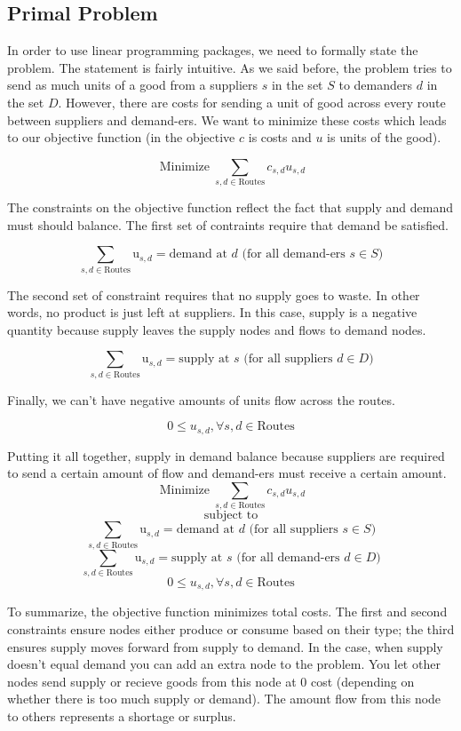 \documentclass{report}
\begin{document}
\subsection{Primal Problem}

In order to use linear programming packages, we need to formally state the problem. The statement is fairly intuitive. As we said before, the problem tries to send as much units of a good from a suppliers $s$ in the set $S$ to demanders $d$ in the set $D$. However, there are costs for sending a unit of good across every route between suppliers and demand-ers. We want to minimize these costs which leads to our objective function (in the objective $c$ is costs and $u$ is units of the good).

$$\operatorname{Minimize} \sum_{s,d \in \text{Routes}} c_{s,d} u_{s,d}$$

The constraints on the objective function reflect the fact that supply and demand must should balance. The first set of contraints require that demand be satisfied.

$$\sum_{s,d \in \text{Routes}} \text{u}_{s,d}= \text{demand at } d \text{ (for all demand-ers } s \in S)$$

The second set of constraint requires that no supply goes to waste. In other words, no product is just left at suppliers. In this case, supply is a negative quantity because supply leaves the supply nodes and flows to demand nodes.

$$\sum_{s,d \in \text{Routes}} \text{u}_{s,d}= \text{supply at } s \text{ (for all suppliers } d \in D)$$

Finally, we can't have negative amounts of units flow across the routes.

$$0 \leq u_{s,d}, \forall s,d \in \text{Routes}$$

Putting it all together, supply in demand balance because suppliers are required to send a certain amount of flow and demand-ers must receive a certain amount.
$$\operatorname{Minimize} \sum_{s,d \in \text{Routes}} c_{s,d} u_{s,d}$$
$$\text{subject to}$$
$$\sum_{s,d \in \text{Routes}} \text{u}_{s,d}= \text{demand at } d \text{ (for all suppliers } s \in S)$$
$$\sum_{s,d \in \text{Routes}} \text{u}_{s,d}= \text{supply at } s \text{ (for all demand-ers } d \in D)$$
$$0 \leq u_{s,d}, \forall s,d \in \text{Routes}$$

To summarize, the objective function minimizes total costs. The first and second constraints ensure nodes either produce or consume based on their type; the third ensures supply moves forward from supply to demand.  In the case, when supply doesn't equal demand you can add an extra node to the problem. You let other nodes send supply or recieve goods from this node at 0 cost (depending on whether there is too much supply or demand). The amount flow from this node to others represents a shortage or surplus.
\end{document}
